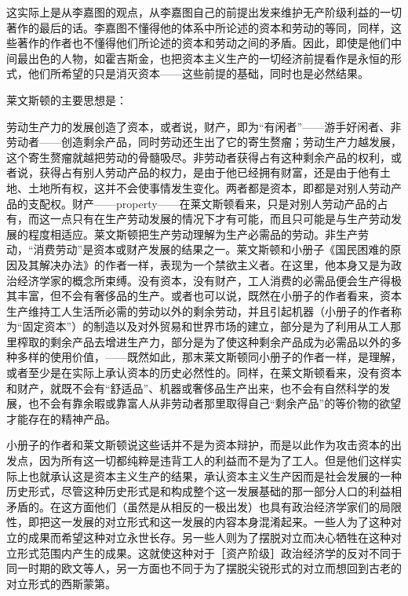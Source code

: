 这实际上是从李嘉图的观点，从李嘉图自己的前提出发来维护无产阶级利益的一切著作的最后的话。李嘉图不懂得他的体系中所论述的资本和劳动的等同，同样，这些著作的作者也不懂得他们所论述的资本和劳动之间的矛盾。因此，即使是他们中间最出色的人物，如霍吉斯金，也把资本主义生产的一切经济前提看作是永恒的形式，他们所希望的只是消灭资本——这些前提的基础，同时也是必然结果。

莱文斯顿的主要思想是：

劳动生产力的发展创造了资本，或者说，财产，即为“有闲者”——游手好闲者、非劳动者——创造剩余产品，同时劳动还生出了它的寄生赘瘤；劳动生产力越发展，这个寄生赘瘤就越把劳动的骨髓吸尽。非劳动者获得占有这种剩余产品的权利，或者说，获得占有别人劳动产品的权力，是由于他已经拥有财富，还是由于他有土地、土地所有权，这并不会使事情发生变化。两者都是资本，即都是对别人劳动产品的支配权。财产——property——在莱文斯顿看来，只是对别人劳动产品的占有，而这一点只有在生产劳动发展的情况下才有可能，而且只可能是与生产劳动发展的程度相适应。莱文斯顿把生产劳动理解为生产必需品的劳动。非生产劳动，“消费劳动”是资本或财产发展的结果之一。莱文斯顿和小册子《国民困难的原因及其解决办法》的作者一样，表现为一个禁欲主义者。在这里，他本身又是为政治经济学家的概念所束缚。没有资本，没有财产，工人消费的必需品便会生产得极其丰富，但不会有奢侈品的生产。或者也可以说，既然在小册子的作者看来，资本生产维持工人生活所必需的劳动以外的剩余劳动，并且引起机器（小册子的作者称为“固定资本”）的制造以及对外贸易和世界市场的建立，部分是为了利用从工人那里榨取的剩余产品去增进生产力，部分是为了使这种剩余产品成为必需品以外的多种多样的使用价值，——既然如此，那末莱文斯顿同小册子的作者一样，是理解，或者至少是在实际上承认资本的历史必然性的。同样，在莱文斯顿看来，没有资本和财产，就既不会有“舒适品”、机器或奢侈品生产出来，也不会有自然科学的发展，也不会有靠余暇或靠富人从非劳动者那里取得自己“剩余产品”的等价物的欲望才能存在的精神产品。

小册子的作者和莱文斯顿说这些话并不是为资本辩护，而是以此作为攻击资本的出发点，因为所有这一切都纯粹是违背工人的利益而不是为了工人。但是他们这样实际上也就承认这是资本主义生产的结果，承认资本主义生产因而是社会发展的一种历史形式，尽管这种历史形式是和构成整个这一发展基础的那一部分人口的利益相矛盾的。在这方面他们（虽然是从相反的一极出发）也具有政治经济学家们的局限性，即把这一发展的对立形式和这一发展的内容本身混淆起来。一些人为了这种对立的成果而希望这种对立永世长存。另一些人则为了摆脱对立而决心牺牲在这种对立形式范围内产生的成果。这就使这种对于［资产阶级］政治经济学的反对不同于同一时期的欧文等人，另一方面也不同于为了摆脱尖锐形式的对立而想回到古老的对立形式的西斯蒙第。


